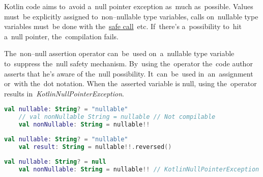 Kotlin code aims to~avoid a~null pointer exception as~much as~possible.
Values must~be explicitly assigned to~non--nullable type variables, calls on~nullable type variables must~be done with the~\hyperref[kotlinsafecall]{safe call}~etc.
If~there's a~possibility to~hit a~null pointer, the~compilation fails.

\mbox{The~non--null} assertion operator can~be~used on~a~nullable type variable to~suppress the~null safety mechanism.
By~using the~operator the~code author asserts that he's aware of the~null possibility.
It~can~be~used in~an~assignment or~with the~dot notation.
When the~asserted variable is null, using the~operator results \mbox{in \textit{KotlinNullPointerException}.}

\begin{lstlisting}[language=Kotlin]
    val nullable: String? = "nullable"
    // val nonNullable String = nullable // Not compilable
    val nonNullable: String = nullable!!
\end{lstlisting}
\newpage

\begin{lstlisting}[language=Kotlin]
    val nullable: String? = "nullable"
    val result: String = nullable!!.reversed()
\end{lstlisting}

\begin{lstlisting}[language=Kotlin]
    val nullable: String? = null
    val nonNullable: String = nullable!! // KotlinNullPointerException
\end{lstlisting}
